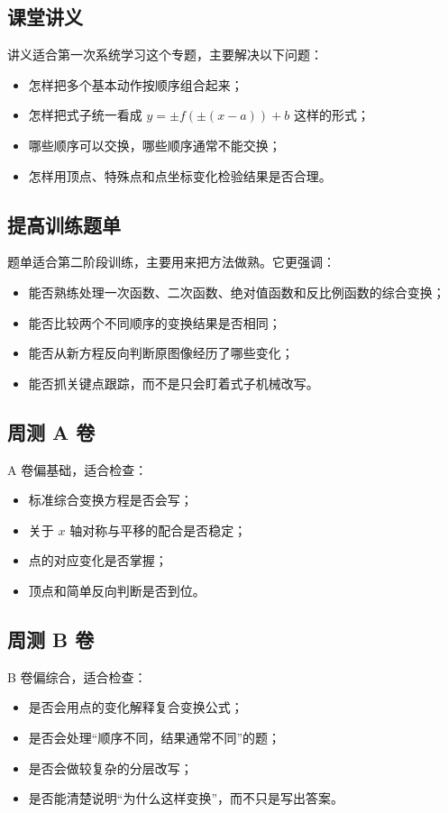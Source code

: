 \documentclass[11pt,a4paper,fontset=fandol]{ctexart}
\begin{document}
\subsection{课堂讲义}
讲义适合第一次系统学习这个专题，主要解决以下问题：
\begin{itemize}
  \item 怎样把多个基本动作按顺序组合起来；
  \item 怎样把式子统一看成 \(y=\pm f(\pm(x-a))+b\) 这样的形式；
  \item 哪些顺序可以交换，哪些顺序通常不能交换；
  \item 怎样用顶点、特殊点和点坐标变化检验结果是否合理。
\end{itemize}

\subsection{提高训练题单}
题单适合第二阶段训练，主要用来把方法做熟。它更强调：
\begin{itemize}
  \item 能否熟练处理一次函数、二次函数、绝对值函数和反比例函数的综合变换；
  \item 能否比较两个不同顺序的变换结果是否相同；
  \item 能否从新方程反向判断原图像经历了哪些变化；
  \item 能否抓关键点跟踪，而不是只会盯着式子机械改写。
\end{itemize}

\subsection{周测 A 卷}
A 卷偏基础，适合检查：
\begin{itemize}
  \item 标准综合变换方程是否会写；
  \item 关于 \(x\) 轴对称与平移的配合是否稳定；
  \item 点的对应变化是否掌握；
  \item 顶点和简单反向判断是否到位。
\end{itemize}

\subsection{周测 B 卷}
B 卷偏综合，适合检查：
\begin{itemize}
  \item 是否会用点的变化解释复合变换公式；
  \item 是否会处理“顺序不同，结果通常不同”的题；
  \item 是否会做较复杂的分层改写；
  \item 是否能清楚说明“为什么这样变换”，而不只是写出答案。
\end{itemize}
\end{document}

